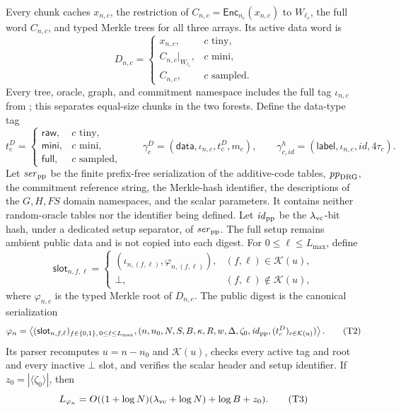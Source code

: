 \documentclass[11pt]{article}
\begin{document}
Every chunk caches $x_{n,c}$, the restriction of
$C_{n,c}=\mathsf{Enc}_{n_c}(x_{n,c})$ to $W_{\ell_c}$, the full word
$C_{n,c}$, and typed Merkle trees for all three arrays.  Its active data word is
\[
 D_{n,c}=\begin{cases}
 x_{n,c},&c\text{ tiny},\\
 C_{n,c}|_{W_{\ell_c}},&c\text{ mini},\\
 C_{n,c},&c\text{ sampled}.
 \end{cases}
\tag{9}\label{eq:active-word}
\]
Every tree, oracle, graph, and commitment namespace includes the full tag
$\iota_{n,c}$ from ; this separates equal-size chunks in
the two forests.  Define the data-type tag
\[
 t^D_c=\begin{cases}
 \mathsf{raw},&c\text{ tiny},\\
 \mathsf{mini},&c\text{ mini},\\
 \mathsf{full},&c\text{ sampled},
 \end{cases}
 \qquad
 \gamma^D_c=(\mathsf{data},\iota_{n,c},t^D_c,m_c),
 \qquad
 \gamma^h_{c,\mathit{id}}
   =(\mathsf{label},\iota_{n,c},\mathit{id},4\tau_c).
\tag{T1}\label{eq:type-tags}
\]
Let $\mathit{ser}_{\rm pp}$ be the finite prefix-free serialization of the
additive-code tables, $\mathit{pp}_{\rm DRG}$, the commitment reference string,
the Merkle-hash identifier, the descriptions of the $G,H,FS$ domain
namespaces, and the scalar parameters.  It contains neither random-oracle
tables nor the identifier being defined.  Let $\mathit{id}_{\rm pp}$ be the
$\lambda_{\rm vc}$-bit hash, under a dedicated setup separator, of
$\mathit{ser}_{\rm pp}$.  The full setup remains ambient public data and is not
copied into each digest.  For
$0\le\ell\le L_{\max}$, define
\[
 \mathsf{slot}_{n,f,\ell}=
 \begin{cases}
  (\iota_{n,(f,\ell)},\varphi_{n,(f,\ell)}),&(f,\ell)\in\mathcal K(u),\\
  \bot,&(f,\ell)\notin\mathcal K(u),
 \end{cases}
\]
where $\varphi_{n,c}$ is the typed Merkle root of $D_{n,c}$.  The public digest
is the canonical serialization
\[
 \varphi_n=\left\langle
 (\mathsf{slot}_{n,f,\ell})_{f\in\{0,1\},\,0\le\ell\le L_{\max}},
 (n,n_0,N,S,B,\kappa,R,w,\Delta,\zeta_0,\mathit{id}_{\rm pp},
      (t^D_c)_{c\in\mathcal K(u)})\right\rangle.
\tag{T2}\label{eq:public-digest}
\]
Its parser recomputes $u=n-n_0$ and $\mathcal K(u)$, checks every active tag
and root and every inactive $\bot$ slot, and verifies the scalar header and
setup identifier.  If $z_0=|\langle\zeta_0\rangle|$, then
\[
 L_{\varphi_n}=O((1+\log N)(\lambda_{\rm vc}+\log N)+\log B+z_0).
\tag{T3}\label{eq:digest-length}
\]
\end{document}
